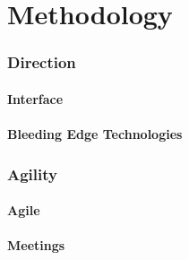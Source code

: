 \chapter{Methodology}	%

\subsection{Direction}
\subsubsection{Interface}

\subsubsection{Bleeding Edge Technologies}

\subsection{Agility}
\subsubsection{Agile}

\subsubsection{Meetings}

